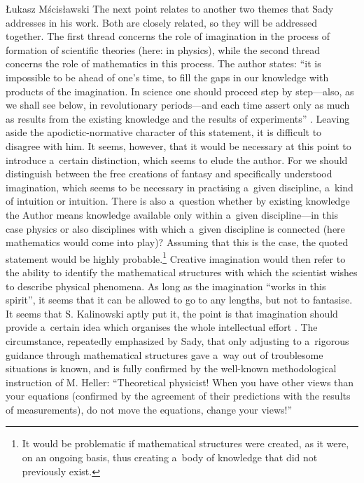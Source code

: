 \begin{newrevengenv}{Łukasz Mścisławski}
The next point relates to another two themes that Sady addresses in his work. Both are closely related, so they will be addressed together. The first thread concerns the role of imagination in the process of formation of scientific theories (here: in physics), while the second thread concerns the role of mathematics in this process. The author states: ``it is impossible to be ahead of one's time, to fill the gaps in our knowledge with products of the imagination. In science one should proceed step by step---also, as we shall see below, in revolutionary periods---and each time assert only as much as results from the existing knowledge and the results of experiments''
\parencite[][p.34]{sady_struktura_2020}. %
 Leaving aside the apodictic-normative character of this statement, it is difficult to disagree with him. It seems, however, that it would be necessary at this point to introduce a~certain distinction, which seems to elude the author. For we should distinguish between the free creations of fantasy and specifically understood imagination, which seems to be necessary in practising a~given discipline, a~kind of intuition or intuition. There is also a~question whether by existing knowledge the Author means knowledge available only within a~given discipline---in this case physics or also disciplines with which a~given discipline is connected (here mathematics would come into play)? Assuming that this is the case, the quoted statement would be highly probable.\footnote{It would be problematic if mathematical structures were created, as it were, on an ongoing basis, thus creating a~body of knowledge that did not previously exist.} Creative imagination would then refer to the ability to identify the mathematical structures with which the scientist wishes to describe physical phenomena. As long as the imagination ``works in this spirit'', it seems that it can be allowed to go to any lengths, but not to fantasise. It seems that S. Kalinowski aptly put it, the point is that imagination should provide a~certain idea which organises the whole intellectual effort 
\parencite[][]{kalinowski_nauka_1916}. %
 The circumstance, repeatedly emphasized by Sady, that only adjusting to a~rigorous guidance through mathematical structures gave a~way out of troublesome situations 
\parencite[e.g.][pp.71--79]{sady_struktura_2020} %
 is known, and is fully confirmed by the well-known methodological instruction of M. Heller: ``Theoretical physicist! When you have other views than your equations (confirmed by the agreement of their predictions with the results of measurements), do not move the equations, change your views!'' 

\end{newrevengenv}
